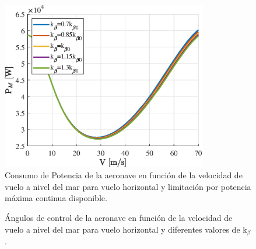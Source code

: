 \begin{figure}
	\centering
	\includegraphics[width=90mm]{graficos/PMVHkbeta}
	\caption{Consumo de Potencia de la aeronave en función de la velocidad de vuelo a nivel del mar para vuelo horizontal y limitación por potencia máxima continua disponible.}
	\label{PMVHkbeta}
\end{figure}
\begin{figure}
	\centering
	\caption{Ángulos de control de la aeronave en función de la velocidad de vuelo a nivel del mar para vuelo horizontal y diferentes valores de k$_\beta$.}
	\label{ControlVHkbeta}
\end{figure}
